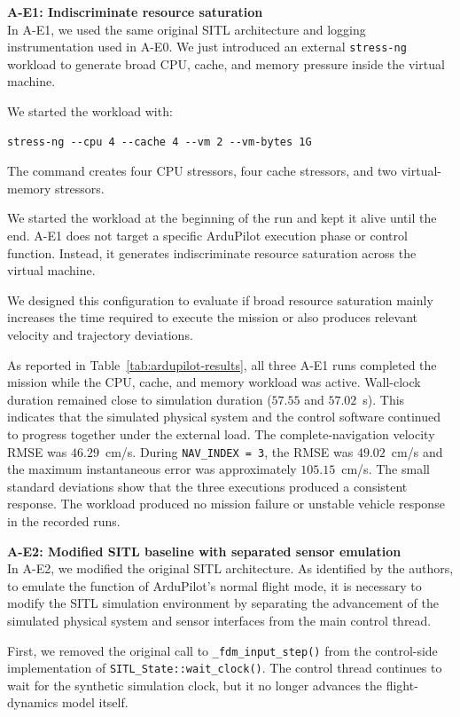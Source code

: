 \noindent \textbf{A-E1: Indiscriminate resource saturation} \\
\noindent In A-E1, we used the same original SITL architecture and logging instrumentation used in A-E0. We just introduced an external \texttt{stress-ng} workload to generate broad CPU, cache, and memory pressure inside the virtual machine.

\noindent We started the workload with:
\begin{verbatim}
stress-ng --cpu 4 --cache 4 --vm 2 --vm-bytes 1G
\end{verbatim}

\noindent The command creates four CPU stressors, four cache stressors, and two virtual-memory stressors.

\noindent We started the workload at the beginning of the run and kept it alive until the end. A-E1 does not target a specific ArduPilot execution phase or control function. Instead, it generates indiscriminate resource saturation across the virtual machine.

\noindent We designed this configuration to evaluate if broad resource saturation mainly increases the time required to execute the mission or also produces relevant velocity and trajectory deviations.

\noindent As reported in Table~\ref{tab:ardupilot-results}, all three A-E1 runs
completed the mission while the CPU, cache, and memory workload was
active. Wall-clock duration remained close to simulation duration
(\(57.55\) and \(57.02\)~s). This indicates that the simulated
physical system and the control software continued to progress
together under the external load.
The complete-navigation velocity RMSE was \(46.29\)~cm/s. During
\texttt{NAV\_INDEX = 3}, the RMSE was \(49.02\)~cm/s and the maximum
instantaneous error was approximately \(105.15\)~cm/s. The small
standard deviations show that the three executions produced a
consistent response.
The workload produced no mission failure or unstable vehicle response in
the recorded runs.

\noindent \textbf{A-E2: Modified SITL baseline with separated sensor emulation} \\
\noindent In A-E2, we modified the original SITL architecture. As identified by the authors, to emulate the function of ArduPilot's normal flight mode, it is necessary to modify the SITL simulation environment by separating the advancement of the simulated physical system and sensor interfaces from the main control thread.

\noindent First, we removed the original call to \texttt{\_fdm\_input\_step()} from the control-side implementation of \texttt{SITL\_State::wait\_clock()}. The control thread continues to wait for the synthetic simulation clock, but it no longer advances the flight-dynamics model itself.

